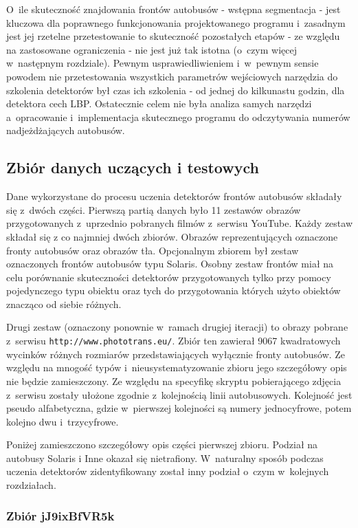 O~ile skuteczność znajdowania frontów autobusów - wstępna segmentacja - 
jest kluczowa dla poprawnego funkcjonowania projektowanego programu 
i~zasadnym jest jej rzetelne przetestowanie to skuteczność pozostałych
etapów - ze względu na zastosowane ograniczenia - nie jest już tak
istotna (o~czym więcej w~następnym rozdziale). Pewnym usprawiedliwieniem
i~w~pewnym sensie powodem nie przetestowania wszystkich parametrów
wejściowych narzędzia do szkolenia detektorów był czas ich szkolenia 
- od jednej do kilkunastu godzin, dla detektora cech LBP. Ostatecznie
celem nie była analiza samych narzędzi a~opracowanie i~implementacja
skutecznego programu do odczytywania numerów nadjeżdżających autobusów.

\subsection{Zbiór danych uczących i testowych}

Dane wykorzystane do procesu uczenia detektorów frontów autobusów
składały się z~dwóch części.
Pierwszą partią danych było 11 zestawów obrazów
przygotowanych z~uprzednio pobranych filmów z~serwisu YouTube.
Każdy zestaw składał się z co najmniej dwóch zbiorów. Obrazów 
reprezentujących oznaczone fronty autobusów oraz obrazów tła. 
Opcjonalnym zbiorem był zestaw oznaczonych 
frontów autobusów typu Solaris. Osobny zestaw frontów miał na celu
porównanie skuteczności detektorów przygotowanych tylko przy pomocy
pojedynczego typu obiektu oraz tych do przygotowania których użyto
obiektów znacząco od siebie różnych.

Drugi zestaw (oznaczony ponownie w~ramach drugiej iteracji) 
to obrazy pobrane z~serwisu \verb|http://www.phototrans.eu/|.
Zbiór ten zawierał 9067 kwadratowych wycinków różnych rozmiarów
przedstawiających wyłącznie fronty autobusów. Ze względu na mnogość
typów i~nieusystematyzowanie zbioru jego szczegółowy opis nie będzie
zamieszczony. Ze względu na specyfikę skryptu pobierającego zdjęcia
z~serwisu zostały ułożone zgodnie z~kolejnością linii autobusowych.
Kolejność jest pseudo alfabetyczna, gdzie w~pierwszej kolejności
są numery jednocyfrowe, potem kolejno dwu i~trzycyfrowe.

Poniżej zamieszczono szczegółowy opis części pierwszej zbioru.
Podział na autobusy Solaris i Inne okazał się nietrafiony. 
W~naturalny sposób podczas uczenia detektorów zidentyfikowany został 
inny podział o~czym w~kolejnych rozdziałach.

\subsubsection{Zbiór jJ9ixBfVR5k}

